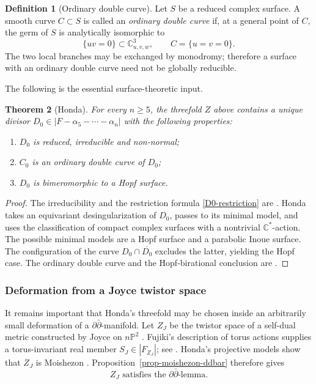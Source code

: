 \documentclass[11pt]{amsart}
\numberwithin{equation}{section}
\def\mb{\mathbb}
\theoremstyle{plain}
\newtheorem{thm}{Theorem}[section]
\theoremstyle{definition}
\newtheorem{defn}[thm]{Definition}
\begin{document}
\begin{defn}[Ordinary double curve]\label{ordinary-double}
Let $S$ be a reduced complex surface.  A smooth curve $C\subset S$ is called
an \emph{ordinary double curve} if, at a general point of $C$, the germ of
$S$ is analytically isomorphic to
\[
 \{uv=0\}\subset\mb C^3_{u,v,w},
 \qquad C=\{u=v=0\}.
\]
The two local branches may be exchanged by monodromy; therefore a surface
with an ordinary double curve need not be globally reducible.
\end{defn}

The following is the essential surface-theoretic input.

\begin{thm}[Honda]\label{Honda-input}
For every $n\geq5$, the threefold $Z$ above contains a unique divisor
$D_0\in|F-\alpha_5-\cdots-\alpha_n|$ with the following properties:
\begin{enumerate}[$(i)$]
\item $D_0$ is reduced, irreducible and non-normal;
\item $C_0$ is an ordinary double curve of $D_0$;
\item $D_0$ is bimeromorphic to a Hopf surface.
\end{enumerate}
\end{thm}

\begin{proof}
The irreducibility and the restriction formula \eqref{D0-restriction} are
\cite[Proposition 3.7.(ii)]{Hn15}.  Honda takes an equivariant
desingularization of $D_0$, passes to its minimal model, and uses the
classification of compact complex surfaces with a nontrivial $\mb C^*$-action.
The possible minimal models are a Hopf surface and a parabolic Inoue surface.
The configuration of the curve $D_0\cap\overline{D_0}$ excludes the latter, yielding
the Hopf case.  The ordinary double curve and the Hopf-birational conclusion
are \cite[Theorem 3.11.(ii)]{Hn15}.
\end{proof}
\subsubsection{Deformation from a Joyce twistor space}

It remains important that Honda's threefold may be chosen inside an
arbitrarily small deformation of a $\partial\bar\partial$-manifold.  Let
$Z_J$ be the twistor space of a self-dual metric constructed by Joyce on $n\mathbb P^2$
\cite[Theorem~3.3.1]{Jy95}.  Fujiki's
description of torus actions supplies a torus-invariant real member
$S_J\in|F_{Z_J}|$; see \cite{Fj00}.  Honda's projective models show that
$Z_J$ is Moishezon \cite[Lemma 2.7 and Theorem 2.8]{Hn08}.
Proposition~\ref{prop-moishezon-ddbar} therefore gives
\begin{equation}\label{Joyce-ddbar}
 Z_J\text{ satisfies the }\partial\bar\partial\text{-lemma}.
\end{equation}
\end{document}
